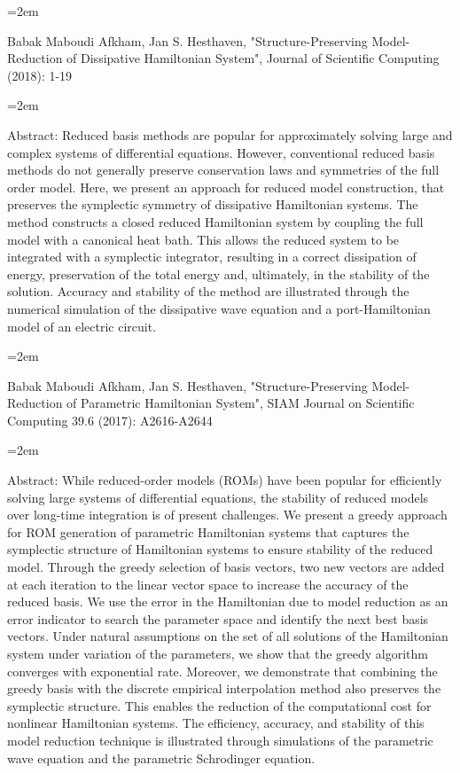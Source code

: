 \documentclass{scrartcl}
\newcommand{\MarginText}[1]{\marginpar{\raggedleft\itshape\small#1}} %
\newcommand{\Description}[1]{\hangindent=2em\hangafter=0\noindent\raggedright\footnotesize{#1}\par\normalsize\vspace{1em}} %
\begin{document}
\begin{cv}{}
\Description{\MarginText{2018}Babak Maboudi Afkham, Jan S. Hesthaven, "Structure-Preserving Model-Reduction of Dissipative Hamiltonian System", Journal of Scientific Computing (2018): 1-19}

\Description{Abstract: Reduced basis methods are popular for approximately solving large and complex systems of differential equations. However, conventional reduced basis methods do not generally preserve conservation laws and symmetries of the full order model. Here, we present an approach for reduced model construction, that preserves the symplectic symmetry of dissipative Hamiltonian systems. The method constructs a closed reduced Hamiltonian system by coupling the full model with a canonical heat bath. This allows the reduced system to be integrated with a symplectic integrator, resulting in a correct dissipation of energy, preservation of the total energy and, ultimately, in the stability of the solution. Accuracy and stability of the method are illustrated through the numerical simulation of the dissipative wave equation and a port-Hamiltonian model of an electric circuit.}

\Description{\MarginText{2017}Babak Maboudi Afkham, Jan S. Hesthaven, "Structure-Preserving Model-Reduction of Parametric Hamiltonian System", SIAM Journal on Scientific Computing 39.6 (2017): A2616-A2644}

\Description{Abstract: While reduced-order models (ROMs) have been popular for efficiently solving large systems of differential equations, the stability of reduced models over long-time integration is of present challenges. We present a greedy approach for ROM generation of parametric Hamiltonian systems that captures the symplectic structure of Hamiltonian systems to ensure stability of the reduced model. Through the greedy selection of basis vectors, two new vectors are added at each iteration to the linear vector space to increase the accuracy of the reduced basis. We use the error in the Hamiltonian due to model reduction as an error indicator to search the parameter space and identify the next best basis vectors. Under natural assumptions on the set of all solutions of the Hamiltonian system under variation of the parameters, we show that the greedy algorithm converges with exponential rate. Moreover, we demonstrate that combining the greedy basis with the discrete empirical interpolation method also preserves the symplectic structure. This enables the reduction of the computational cost for nonlinear Hamiltonian systems. The efficiency, accuracy, and stability of this model reduction technique is illustrated through simulations of the parametric wave equation and the parametric Schrodinger equation.}


\end{cv}
\end{document}
